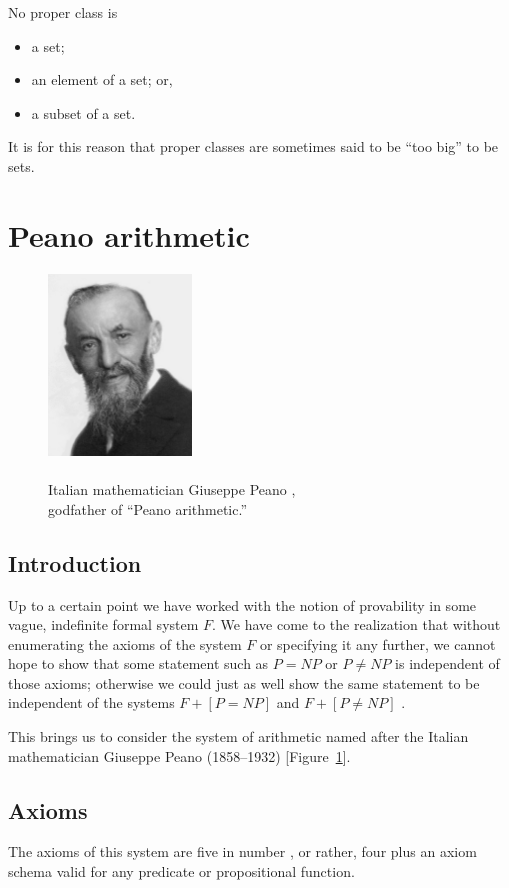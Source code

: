 \documentclass[letterpaper]{article}
\begin{document}
\begin{remark}
No proper class is
\begin{itemize}
	\item a set;
	\item an element of a set; or,
	\item a subset of a set.
\end{itemize}
It is for this reason that proper classes are sometimes said to be ``too big'' to be sets.
\end{remark}
\section{Peano arithmetic}\label{sect-pa}
\begin{figure}
	\centering
	\includegraphics[width=1.5in]{Giuseppe_Peano.jpg}
	\caption[Giuseppe Peano]{~\\Italian mathematician Giuseppe Peano \cite{peano-photo},\\godfather of ``Peano arithmetic.''}
	\label{peanophoto}
\end{figure}
\subsection{Introduction}
Up to a certain point we have worked with the notion of provability in some vague, indefinite formal system $F$.  We have come to the realization that without enumerating the axioms of the system $F$ or specifying it any further, we cannot hope to show that some statement such as $P=NP$ or $P\ne NP$ is independent of those axioms; otherwise we could just as well show the same statement to be independent of the systems $F+[P=NP]$ and $F+[P\ne NP]$ \cite{spector2016ans}.

This brings us to consider the system of arithmetic named after the Italian mathematician Giuseppe Peano (1858--1932) [Figure~\ref{peanophoto}].
\subsection{Axioms}
The axioms of this system are five in number \cite[p.~149]{haowang1957}, or rather, four plus an axiom schema valid for any predicate or propositional function.
\end{document}
